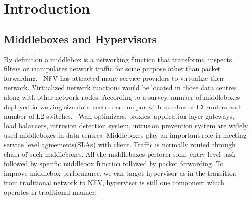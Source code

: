 \documentclass[a4paper,11pt]{report}
\begin{document}
\newpage
\tableofcontents
\listoffigures
\listoftables
\newpage
\chapter{Introduction}
\section{Middleboxes and Hypervisors}
By definition a middlebox is a networking function that transforms, inspects, filters or manipulates network traffic for some purpose other than packet forwarding.~\cite{MB} NFV has attracted many service providers to virtualize their network. Virtualized network functions would be located in those data centres along with other network nodes. According to a survey, number of middleboxes deployed in varying size data centres are on par with number of L3 routers and number of L2 switches.~\cite{DM} Wan optimizers, proxies, application layer gateways, load balancers, intrusion detection system, intrusion prevention system are widely used middleboxes in data centres. Middleboxes play an important role in meeting service level agreements(SLAs) with client. Traffic is normally routed through chain of such middleboxes. All the middleboxes perform some entry level task followed by specific middlebox function followed by packet forwarding. To improve middlebox performance, we can target hypervisor as in the transition from traditional network to NFV, hypervisor is still one component which operates in traditional manner.                        
\end{document}
